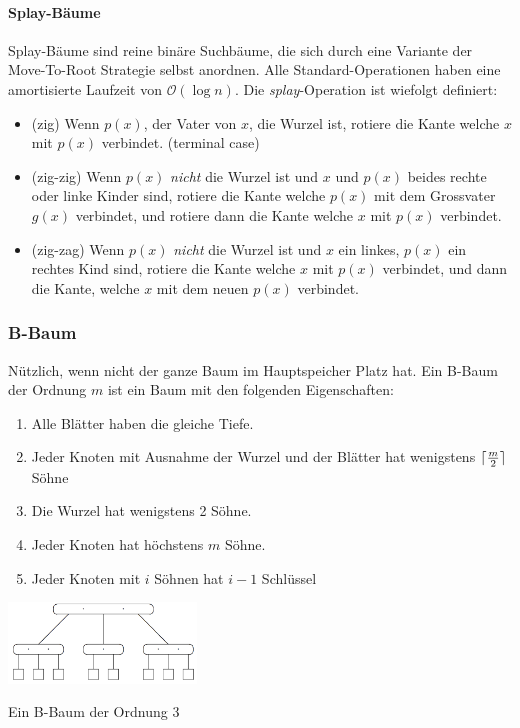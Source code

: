 \documentclass[a4paper, 9pt, DIV=20]{scrartcl}
\DeclarePairedDelimiter{\ceil}{\lceil}{\rceil}
\newcommand{\Oh}{\mathcal{O}}
\begin{document}
\paragraph{Splay-Bäume}
Splay-Bäume sind reine binäre Suchbäume, die sich durch eine Variante der Move-To-Root Strategie selbst anordnen. Alle Standard-Operationen haben eine amortisierte Laufzeit von $\Oh(\log{n})$. Die \emph{splay}-Operation ist wiefolgt definiert:
\begin{itemize}
\item (zig) Wenn $p(x)$, der Vater von $x$, die Wurzel ist, rotiere die Kante welche $x$ mit $p(x)$ verbindet. (terminal case)
\item (zig-zig) Wenn $p(x)$ \emph{nicht} die Wurzel ist und $x$ und $p(x)$ beides rechte oder linke Kinder sind, rotiere die Kante welche $p(x)$ mit dem Grossvater $g(x)$ verbindet, und rotiere dann die Kante welche $x$ mit $p(x)$ verbindet. 
\item (zig-zag) Wenn $p(x)$ \emph{nicht} die Wurzel ist und $x$ ein linkes, $p(x)$ ein rechtes Kind sind, rotiere die Kante welche $x$ mit $p(x)$ verbindet, und dann die Kante, welche $x$ mit dem neuen $p(x)$ verbindet.
\end{itemize}


\subsubsection{B-Baum}
Nützlich, wenn nicht der ganze Baum im Hauptspeicher Platz hat. Ein B-Baum der Ordnung $m$ ist ein Baum mit den folgenden Eigenschaften:
\begin{enumerate}
\item Alle Blätter haben die gleiche Tiefe.
\item Jeder Knoten mit Ausnahme der Wurzel und der Blätter hat wenigstens $\ceil{\frac{m}{2}}$ Söhne
\item Die Wurzel hat wenigstens 2 Söhne.
\item Jeder Knoten hat höchstens $m$ Söhne.
\item Jeder Knoten mit $i$ Söhnen hat $i-1$ Schlüssel
\end{enumerate}

\begin{center}
\includegraphics[width=5cm]{B-Baum}

Ein B-Baum der Ordnung 3
\end{center}
\end{document}
